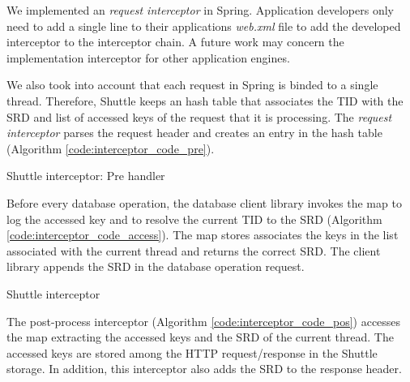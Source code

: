 We implemented an \emph{request interceptor} in Spring. Application developers only need to add a single line to their applications \emph{web.xml} file to add the developed interceptor to the interceptor chain. A future work may concern the implementation interceptor for other application engines.

We also took into account that each request in Spring is binded to a single thread. Therefore, Shuttle keeps an hash table that associates the \acf{TID} with the \acf{SRD} and list of accessed keys of the request that it is processing. The \emph{request interceptor} parses the request header and creates an entry in the hash table (Algorithm \ref{code:interceptor_code_pre}).


\begin{algorithm}
\DontPrintSemicolon{}

	\BlankLine
	\caption{Shuttle interceptor: Pre handler}
	\label{code:interceptor_code_pre}
\end{algorithm}

Before every database operation, the database client library invokes the map to log the accessed key and to resolve the current \acf{TID} to the \ac{SRD} (Algorithm \ref{code:interceptor_code_access}). The map stores associates the keys in the list associated with the current thread and returns the correct \ac{SRD}. The client library appends the \ac{SRD} in the database operation request. 

\begin{algorithm}
\DontPrintSemicolon{}
	
\caption{Shuttle interceptor}
\label{code:interceptor_code_access}
\end{algorithm}

The post-process interceptor (Algorithm \ref{code:interceptor_code_pos}) accesses the map extracting the accessed keys and the \ac{SRD} of the current thread. The accessed keys are stored among the \ac{HTTP} request/response in the Shuttle storage. In addition, this interceptor also adds the \ac{SRD} to the response header.

